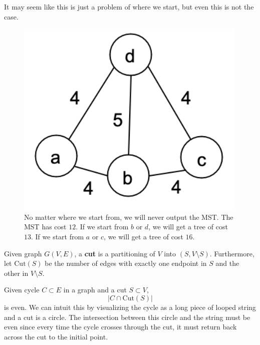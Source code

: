 \documentclass{article}
\begin{document}
      It may seem like this is just a problem of where we start, but even this is not the case. 

      \begin{figure}[H]
        \centering 
        \includegraphics[scale=0.6]{img/dik_mst_prob2.png}
        \caption{No matter where we start from, we will never output the MST. The MST has cost $12$. If  we start from $b$ or $d$, we will get a tree of cost $13$. If we start from $a$ or $c$, we will get a tree of cost $16$.}
        \label{fig:dik_mst_prob2}
      \end{figure}

      \begin{definition}[Cuts]      
        Given graph $G(V, E)$, a \textbf{cut} is a partitioning of $V$ into $(S, V \setminus S)$. Furthermore, let $\mathrm{Cut}(S)$ be the number of edges with exactly one endpoint in $S$ and the other in $V \setminus S$. 
      \end{definition}

      \begin{theorem}
        Given cycle $C \subset E$ in a graph and a cut $S \subset V$, 
        \begin{equation}
          | C \cap \mathrm{Cut}(S) | 
        \end{equation}
        is even. We can intuit this by visualizing the cycle as a long piece of looped string and a cut is a circle. The intersection between this circle and the string must be even since every time the cycle crosses through the cut, it must return back across the cut to the initial point.  
      \end{theorem}
\end{document}
